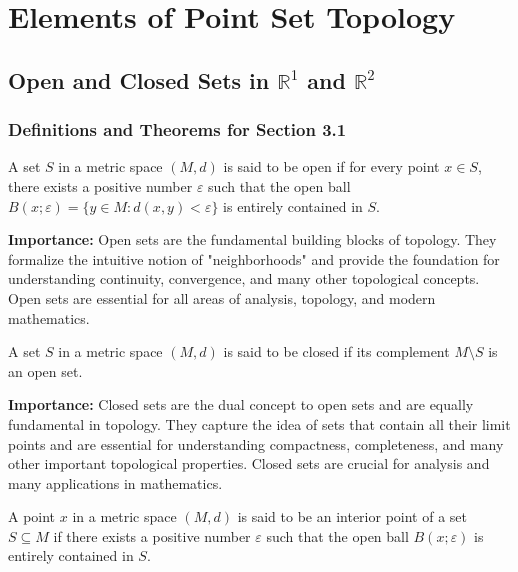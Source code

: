 \chapter{Elements of Point Set Topology}

\section{Open and Closed Sets in $\mathbb{R}^1$ and $\mathbb{R}^2$}

\subsection*{Definitions and Theorems for Section 3.1}

\begin{definition}
A set $S$ in a metric space $(M,d)$ is said to be open if for every point $x \in S$, there exists a positive number $\varepsilon$ such that the open ball $B(x;\varepsilon) = \{y \in M : d(x,y) < \varepsilon\}$ is entirely contained in $S$.
\end{definition}

\noindent\textbf{Importance:} Open sets are the fundamental building blocks of topology. They formalize the intuitive notion of "neighborhoods" and provide the foundation for understanding continuity, convergence, and many other topological concepts. Open sets are essential for all areas of analysis, topology, and modern mathematics.



\begin{definition}
A set $S$ in a metric space $(M,d)$ is said to be closed if its complement $M \setminus S$ is an open set.
\end{definition}

\noindent\textbf{Importance:} Closed sets are the dual concept to open sets and are equally fundamental in topology. They capture the idea of sets that contain all their limit points and are essential for understanding compactness, completeness, and many other important topological properties. Closed sets are crucial for analysis and many applications in mathematics.



\begin{definition}
A point $x$ in a metric space $(M,d)$ is said to be an interior point of a set $S \subseteq M$ if there exists a positive number $\varepsilon$ such that the open ball $B(x;\varepsilon)$ is entirely contained in $S$.
\end{definition}

